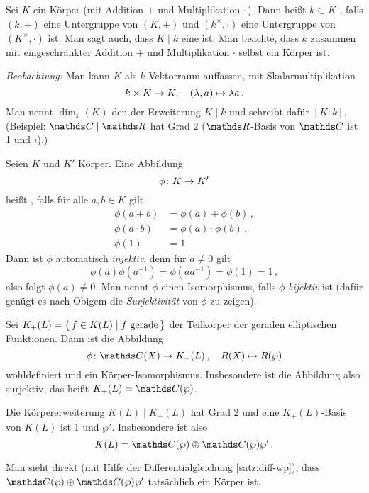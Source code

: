 \begin{erin}
Sei $K$ ein Körper (mit Addition $+$ und Multiplikation $\cdot$\,).
Dann heißt $k\subset K$ , falls $(k,+)$ eine Untergruppe von $(K,+)$ und $(k^\times,\cdot)$ eine Untergruppe von $(K^\times, \cdot)$ ist.
Man sagt auch, dass $K\mid k$ eine  ist.
Man beachte, dass $k$ zusammen mit eingeschränkter Addition $+$ und Multiplikation $\cdot$ selbst ein Körper ist.

\emph{Beobachtung:}
Man kann $K$ als $k$-Vektorraum auffassen, mit Skalarmultiplikation
\[
	k\times K\rightarrow K,
	\quad (\lambda,a)\mapsto \lambda a
	\,.
\]
Man nennt $\dim_k(K)$ den  der Erweiterung $K\mid k$ und schreibt dafür $[K:k]$.
(Beispiel: $\CC\mid\RR$ hat Grad 2 ($\RR$-Basis von $\CC$ ist 1 und $i$).)

Seien $K$ und $K'$ Körper.
Eine Abbildung
\[
	\phi\colon K\rightarrow K'
\]
heißt , falls für alle $a, b \in K$ gilt
\begin{align*}
	\phi(a+b) &= \phi(a)+\phi(b)\,, \\
	\phi(a\cdot b) &= \phi(a)\cdot\phi(b)\,, \\
	\phi(1)&=1
\end{align*}
Dann ist $\phi$ automatisch \emph{injektiv}, denn für $a \neq 0$ gilt
\[
	\phi(a)\phi(a^{-1})
	= \phi(a a^{-1})
	= \phi(1)= 1
	\,,
\]
also folgt $\phi(a)\neq 0$.
Man nennt $\phi$ einen Isomorphismus, falls $\phi$ \emph{bijektiv} ist (dafür genügt es nach Obigem die \emph{Surjektivität} von $\phi$ zu zeigen).
\end{erin}

\begin{satz-list}[Struktursatz]
\item Sei $K_+(L) = \left\{\,f\in K(L) \mid f \text{ gerade}\,\right\}$ der Teilkörper der geraden elliptischen Funktionen.
Dann ist die Abbildung
\[
	\phi\colon \CC(X) \ra K_+(L)\,,
	\quad R(X) \mapsto R(\wp)
\]
wohldefiniert und ein Körper-Isomorphismus.
Insbesondere ist die Abbildung also surjektiv, das heißt $K_+(L) = \CC(\wp)$.

\item Die Körpererweiterung $K(L) \mid K_+(L)$ hat Grad 2 und eine $K_+(L)$-Basis von $K(L)$ ist 1 und $\wp'$.
Insbesondere ist also
\[
	K(L)
	= \CC(\wp) \oplus \CC(\wp) \wp'
	\,.
\]
\end{satz-list}

\begin{beme}[Übung]
Man sieht direkt (mit Hilfe der Differentialgleichung \autoref{satz:diff-wp}), dass $\CC(\wp) \oplus \CC(\wp) \wp'$ tatsächlich ein Körper ist.
\end{beme}

